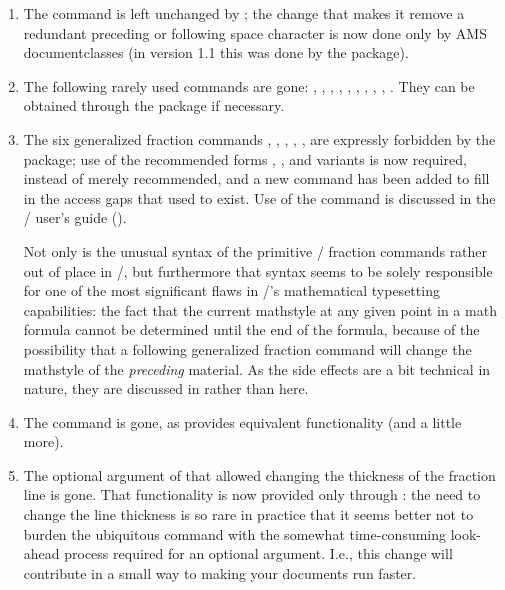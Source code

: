\documentclass{amsdtx}
\begin{document}
\begin{enumerate}
\item The \qc{\~} command is left unchanged by ; the change
that makes it remove a redundant preceding or following space character
is now done only by AMS documentclasses (in version 1.1 this was done by
the  package).

\item The following rarely used commands are gone: ,
, , , , ,
, , , . They can be obtained
through the  package if necessary.

\item The six generalized fraction commands ,
, , , ,
 are expressly forbidden by the 
package; use of the recommended forms , , and
variants is now required, instead of merely recommended, and a new
command  has been added to fill in the access gaps that used
to exist. Use of the  command is discussed in the \amslatex/
user's guide ().

Not only is the unusual syntax of the primitive \tex/ fraction commands
rather out of place in \latex/, but furthermore that syntax seems to be
solely responsible for one of the most significant flaws in \tex/'s
mathematical typesetting capabilities: the fact that the current
mathstyle at any given point in a math formula cannot be determined
until the end of the formula, because of the possibility that a
following generalized fraction command will change the mathstyle of the
\emph{preceding} material. As the side effects are a bit technical in
nature, they are discussed in  rather than here.

\item The  command is gone, as  provides
equivalent functionality (and a little more).

\item The optional argument of  that allowed changing the
thickness of the fraction line is gone. That functionality is now
provided only through : the need to change the line
thickness is so rare in practice that it seems better not to burden the
ubiquitous  command with the somewhat time-consuming look-ahead
process required for an optional argument. I.e., this change will
contribute in a small way to making your documents run faster.


\end{enumerate}
\end{document}
